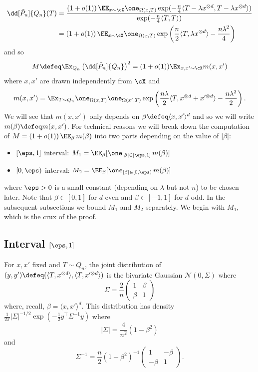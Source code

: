 \documentclass{article}
\begin{document}
\begin{align*}
\dd[\tilde P_n]{Q_n}(T)
&= \frac{(1+o(1))\, \EE_{x \sim \cX} \one_{\Omega(x,T)} \exp(-\frac{n}{4} \langle T - \lambda x^{\otimes d},T - \lambda x^{\otimes d} \rangle)}{\exp(-\frac{n}{4} \langle T,T \rangle)} \\
&= (1+o(1))\,\EE_{x \sim \cX} \one_{\Omega(x,T)} \exp\left(\frac{n}{2} \langle T, \lambda x^{\otimes d} \rangle - \frac{n\lambda^2}{4} \right)
\end{align*}
and so
$$M \defeq \Ex_{Q_n} \left(\dd[\tilde P_n]{Q_n}\right)^2 = (1+o(1)) \Ex_{x,x' \sim \cX} m(x,x')$$
where $x,x'$ are drawn independently from $\cX$ and
\begin{equation}
\label{eq:defn-m}
m(x,x') = \Ex_{T \sim Q_n} \one_{\Omega(x,T)}\one_{\Omega(x',T)} \exp\left(\frac{n\lambda}{2} \langle T, x^{\otimes d} + x'^{\otimes d} \rangle - \frac{n\lambda^2}{2} \right).
\end{equation}
We will see that $m(x,x')$ only depends on $\beta \defeq \langle x,x' \rangle^d$ and so we will write $m(\beta) \defeq m(x,x')$. For technical reasons we will break down the computation of $M = (1+o(1))\,\EE_\beta \,m(\beta)$ into two parts depending on the value of $|\beta|$:
\begin{itemize}
\item $[\eps,1]$ interval: $M_1 = \EE_\beta[\one_{|\beta| \in [\eps,1]} \,m(\beta)]$
\item $[0,\eps)$ interval: $M_2 = \EE_\beta[\one_{|\beta| \in [0,\eps)} \,m(\beta)]$
\end{itemize}
where $\eps > 0$ is a small constant (depending on $\lambda$ but not $n$) to be chosen later. Note that $\beta \in [0,1]$ for $d$ even and $\beta \in [-1,1]$ for $d$ odd. In the subsequent subsections we bound $M_1$ and $M_2$ separately. We begin with $M_1$, which is the crux of the proof.

\subsection{Interval $[\eps,1]$}



For $x,x'$ fixed and $T \sim Q_n$, the joint distribution of $(y,y') \defeq (\langle T, x^{\otimes d} \rangle, \langle T, x'^{\otimes d} \rangle)$ is the bivariate Gaussian $\mathcal{N}(0,\Sigma)$ where
$$\Sigma = \frac{2}{n} \left(\begin{array}{cc} 1 & \beta \\ \beta & 1 \end{array}\right)$$
where, recall, $\beta = \langle x,x' \rangle^d$. This distribution has density $\frac{1}{2 \pi} |\Sigma|^{-1/2} \exp\left(-\frac{1}{2} y^\top \Sigma^{-1} y\right)$ where
$$|\Sigma| = \frac{4}{n^2}(1-\beta^2)$$
and
$$\Sigma^{-1} = \frac{n}{2} (1-\beta^2)^{-1} \left(\begin{array}{cc} 1 & -\beta \\ -\beta & 1 \end{array}\right).$$
\end{document}
